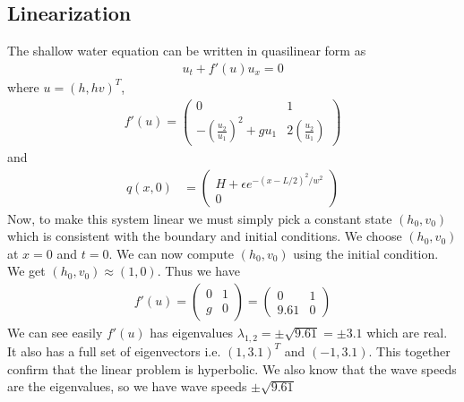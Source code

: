 \subsection{Linearization}

The shallow water equation can be written in quasilinear form as \begin{align*}
u_t + f'(u) u_x = 0
\end{align*}
where $ u = (h,hv)^T $,
\begin{align*}
f'(u) = \begin{pmatrix}
0 & 1 \\
-(\frac{u_2}{u_1})^2 + gu_1 & 2 (\frac{u_2}{u_1})
\end{pmatrix}
\end{align*}
and 
\begin{align*}
q(x,0) &= \begin{pmatrix}
H + \epsilon e^{-(x-L/2)^2/w^2} \\
0
\end{pmatrix} 
\end{align*}
Now, to make this system linear we must simply pick a constant state $(h_0,v_0)$ which is consistent with the boundary and initial conditions. We choose $(h_0,v_0)$ at $x=0$ and $t=0$. We can now compute $(h_0,v_0)$ using the initial condition. We get $(h_0,v_0) \approx (1,0)$. Thus we have 
\begin{align*}
f'(u) = \begin{pmatrix}
0 & 1 \\
g & 0
\end{pmatrix} = \begin{pmatrix}
0 & 1 \\
9.61 & 0
\end{pmatrix}
\end{align*}
We can see easily $f'(u)$ has eigenvalues $\lambda_{1,2} = \pm \sqrt{9.61} = \pm 3.1$ which are real. It also has a full set of eigenvectors i.e. $(1,3.1)^T$ and $(-1,3.1)$. This together confirm that the linear problem is hyperbolic. We also know that the wave speeds are the eigenvalues, so we have wave speeds $\pm \sqrt{9.61}$

